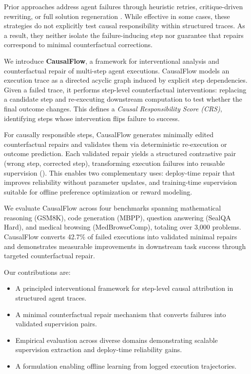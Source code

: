 \documentclass{article}
\theoremstyle{plain}
\theoremstyle{definition}
\theoremstyle{remark}
\begin{document}
Prior approaches address agent failures through heuristic retries, critique-driven rewriting, or full solution regeneration \citep{shinn2023reflexion, madaan2023selfrefine, yao2023tree, gou2024critic, chen2024selfdebugging, yang2024sweagent}. While effective in some cases, these strategies do not explicitly test causal responsibility within structured traces. As a result, they neither isolate the failure-inducing step nor guarantee that repairs correspond to minimal counterfactual corrections.

We introduce \textbf{CausalFlow}, a framework for interventional analysis and counterfactual repair of multi-step agent executions. CausalFlow models an execution trace as a directed acyclic graph induced by explicit step dependencies. Given a failed trace, it performs step-level counterfactual interventions: replacing a candidate step and re-executing downstream computation to test whether the final outcome changes. This defines a \emph{Causal Responsibility Score (CRS)}, identifying steps whose intervention flips failure to success.

For causally responsible steps, CausalFlow generates minimally edited counterfactual repairs and validates them via deterministic re-execution or outcome prediction. Each validated repair yields a structured contrastive pair (wrong step, corrected step), transforming execution failures into reusable supervision (). This enables two complementary uses: deploy-time repair that improves reliability without parameter updates, and training-time supervision suitable for offline preference optimization or reward modeling.

We evaluate CausalFlow across four benchmarks spanning mathematical reasoning (GSM8K), code generation (MBPP), question answering (SealQA Hard), and medical browsing (MedBrowseComp), totaling over 3,000 problems. CausalFlow converts 42.7\% of failed executions into validated minimal repairs and demonstrates measurable improvements in downstream task success through targeted counterfactual repair.

Our contributions are:
\begin{itemize}
\setlength{\topsep}{0pt}
\setlength{\itemsep}{2pt}
\setlength{\parskip}{0pt}
\setlength{\parsep}{0pt}
    \item A principled interventional framework for step-level causal attribution in structured agent traces.
    \item A minimal counterfactual repair mechanism that converts failures into validated supervision pairs.
    \item Empirical evaluation across diverse domains demonstrating scalable supervision extraction and deploy-time reliability gains.
    \item A formulation enabling offline learning from logged execution trajectories.
\end{itemize}
\end{document}
